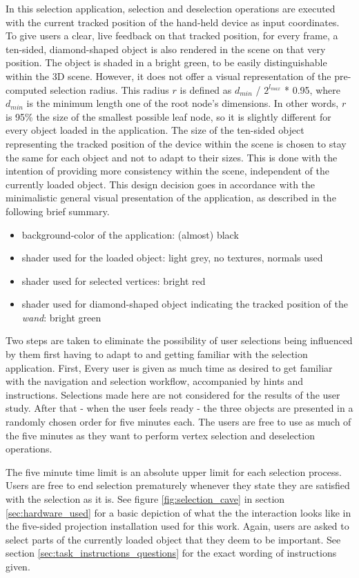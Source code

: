 In this selection application, selection and deselection operations are executed with the current tracked position of the hand-held device as input coordinates. To give users a clear, live feedback on that tracked position, for every frame, a ten-sided, diamond-shaped object is also rendered in the scene on that very position. The object is shaded in a bright green, to be easily distinguishable within the 3D scene. However, it does not offer a visual representation of the pre-computed selection radius. This radius $r$ is defined as $d_{min}$ / $2^{l_{max}}$ * 0.95, where $d_{min}$ is the minimum length one of the root node's dimensions. In other words, $r$ is 95\% the size of the smallest possible leaf node, so it is slightly different for every object loaded in the application. The size of the ten-sided object representing the tracked position of the device within the scene is chosen to stay the same for each object and not to adapt to their sizes. This is done with the intention of providing more consistency within the scene, independent of the currently loaded object. This design decision goes in accordance with the minimalistic general visual presentation of the application, as described in the following brief summary.

\begin{itemize}
	\item background-color of the application: (almost) black
	\item shader used for the loaded object: light grey, no textures, normals used
	\item shader used for selected vertices: bright red
	\item shader used for diamond-shaped object indicating the tracked position of the \textit{wand}: bright green
\end{itemize}

Two steps are taken to eliminate the possibility of user selections being influenced by them first having to adapt to and getting familiar with the selection application. First, Every user is given as much time as desired to get familiar with the navigation and selection workflow, accompanied by hints and instructions. Selections made here are not considered for the results of the user study. After that - when the user feels ready - the three objects are presented in a randomly chosen order for five minutes each. The users are free to use as much of the five minutes as they want to perform vertex selection and deselection operations.

The five minute time limit is an absolute upper limit for each selection process. Users are free to end selection prematurely whenever they state they are satisfied with the selection as it is. See figure \ref{fig:selection_cave} in section \ref{sec:hardware_used} for a basic depiction of what the the interaction looks like in the five-sided projection installation used for this work. Again, users are asked to select parts of the currently loaded object that they deem to be important. See section \ref{sec:task_instructions_questions} for the exact wording of instructions given.

